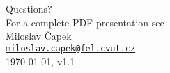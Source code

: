 \documentclass[xcolor=dvipsnames, aspectratio=169, handout, intlimits]{beamer}
\makeatletter
\newcommand{\myEmail}{\texttt{\href{mailto:miloslav.capek@fel.cvut.cz}{miloslav.capek@fel.cvut.cz}}}
\newcommand{\myDate}{ %
\today}
\newcommand{\myVersion}{ %
v1.1
}
\makeatother
\begin{document}
\section*{}
\begin{frame}
	\vspace{12mm}
	\begin{center}
		\huge{\textcolor{elmagDark}{Questions?}} \\
		\vspace{15mm} 
		\small{For a complete PDF presentation see \href{www.capek.elmag.org}{}} \\
		\vspace{15mm}
		\normalsize{Miloslav \v{C}apek \\
			\myEmail \\
			\vspace{3mm}
			\myDate, \myVersion}
	\end{center}
	\vfill
\end{frame}
\end{document}
